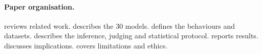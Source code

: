 
\paragraph{Paper organisation.}  reviews related work.
 describes the 30 models.  defines the
behaviours and datasets.  describes the inference, judging and
statistical protocol.  reports results. 
discusses implications.  covers limitations and ethics.
